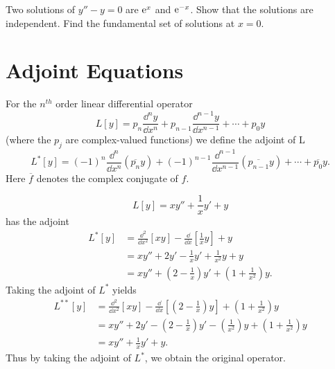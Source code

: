 \begin{Exercise}
  \label{exercise fundamental set y-y=0}
  Two solutions of $y'' - y = 0$ are $\mathop{\mathrm{e}}\nolimits^x$ and $\mathop{\mathrm{e}}\nolimits^{-x}$.  Show that the 
  solutions are independent.  Find the fundamental set of solutions at
  $x = 0$.

\end{Exercise}









\section{Adjoint Equations}
\label{sec_adj_eqn}

For the $n^{t h}$ order linear differential operator
\[ 
L[y] = p_n \frac{\dd^n y}{\dd x^n} + p_{n-1} \frac{\dd^{n-1} y}{\dd x^{n-1}} + \cdots + p_0 y
\]
(where the $p_j$ are complex-valued functions) we define the adjoint of L
\[ 
L^*[y] = (-1)^n \frac{\dd^n}{\dd x^n} (\overline{p_n} y) + (-1)^{n-1} 
\frac{\dd^{n-1}}{\dd x^{n-1}}(\overline{p_{n-1}} y) + \cdots + \overline{p_0} y. 
\]
Here $\overline{f}$ denotes the complex conjugate of $f$.




\begin{Example}
  \[ L[y] = x y'' + \frac{1}{x} y' + y \]
  has the adjoint
  \begin{align*} 
    L^*[y] &= \frac{\dd^2}{\dd x^2}[x y] 
    - \frac{\dd}{\dd x} \left[ \frac{1}{x} y\right] + y \\
    &= x y'' + 2y' - \frac{1}{x} y' + \frac{1}{x^2} y + y \\
    &= x y'' + \left(2 - \frac{1}{x} \right) y' + \left( 1 + \frac{1}{x^2}
    \right) y.
  \end{align*}
  Taking the adjoint of $L^*$ yields
  \begin{align*}
    L^{**}[y] &= \frac{\dd^2}{\dd x^2}[x y] 
    - \frac{\dd}{\dd x} \left[ \left(2 - \frac{1}{x}
      \right) y \right] + \left( 1 + \frac{1}{x^2} \right) y \\
    &= x y'' + 2y' - \left(2 - \frac{1}{x} \right) y' - \left(
      \frac{1}{x^2} \right) y + \left(1 + \frac{1}{x^2} 
    \right) y \\
    &= x y'' + \frac{1}{x} y' + y.
  \end{align*}
  Thus by taking the adjoint of $L^*$, we obtain the original operator.
\end{Example}




